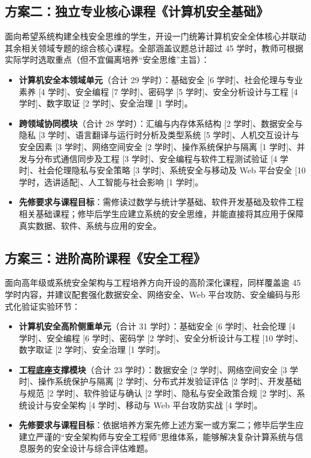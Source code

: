 \subsection{方案二：独立专业核心课程《计算机安全基础》}
面向希望系统构建全栈安全思维的学生，开设一门统筹计算机安全全体核心并联动其余相关领域专题的综合核心课程。全部涵盖议题总计超过 45 学时，教师可根据实际学时选取重点（但不宜偏离培养“安全思维”主旨）：
\begin{itemize}\setlength{\itemsep}{0pt}\setlength{\parskip}{0pt}
    \item \textbf{计算机安全本领域单元}（合计 29 学时）：基础安全 [6 学时]、社会伦理与专业素养 [4 学时]、安全编程 [7 学时]、密码学 [5 学时]、安全分析设计与工程 [4 学时]、数字取证 [2 学时]、安全治理 [1 学时]。
    \item \textbf{跨领域协同模块}（合计 28 学时）：汇编与内存体系结构 [2 学时]、数据安全与隐私 [3 学时]、语言翻译与运行时分析及类型系统 [5 学时]、人机交互设计与安全因素 [3 学时]、网络空间安全 [2 学时]、操作系统保护与隔离 [1 学时]、并发与分布式通信同步及工程 [3 学时]、安全编程与软件工程测试验证 [4 学时]、社会伦理隐私与安全策略 [3 学时]、系统安全与移动及 Web 平台安全 [10 学时，选讲适配]、人工智能与社会影响 [1 学时]。
    \item \textbf{先修要求与课程目标}：需修读过数学与统计学基础、软件开发基础及软件工程相关基础课程；修毕后学生应建立系统的安全思维，并能直接将其应用于保障真实数据、软件、系统与应用的安全。
\end{itemize}

\subsection{方案三：进阶高阶课程《安全工程》}
面向高年级或系统安全架构与工程培养方向开设的高阶深化课程，同样覆盖逾 45 学时内容，并建议配套强化数据安全、网络安全、Web 平台攻防、安全编码与形式化验证实验环节：
\begin{itemize}\setlength{\itemsep}{0pt}\setlength{\parskip}{0pt}
    \item \textbf{计算机安全高阶侧重单元}（合计 31 学时）：基础安全 [6 学时]、社会伦理 [4 学时]、安全编程 [6 学时]、密码学 [2 学时]、安全分析设计与工程 [10 学时]、数字取证 [2 学时]、安全治理 [1 学时]。
    \item \textbf{工程底座支撑模块}（合计 23 学时）：数据安全 [2 学时]、网络空间安全 [3 学时]、操作系统保护与隔离 [2 学时]、分布式并发验证评估 [2 学时]、开发基础与规范 [2 学时]、软件验证与确认 [2 学时]、隐私与安全政策合规 [2 学时]、系统设计与安全架构 [4 学时]、移动与 Web 平台攻防实战 [4 学时]。
    \item \textbf{先修要求与课程目标}：依据培养方案先修上述方案一或方案二；修毕后学生应建立严谨的“安全架构师与安全工程师”思维体系，能够解决复杂计算系统与信息服务的安全设计与综合评估难题。
\end{itemize}

